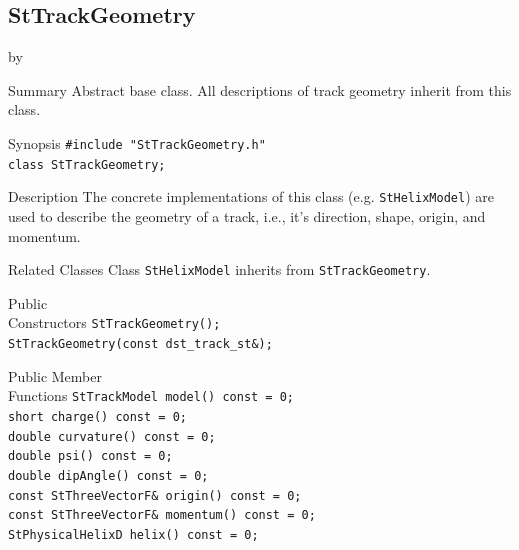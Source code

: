 \documentclass[twoside]{article}
\newcommand{\entrylabel}[1]{\mbox{\textbf{{#1}}}\hfil}%
\newenvironment{entry}
{\begin{list}{}%
    {\renewcommand{\makelabel}{\entrylabel}%
     \setlength{\labelwidth}{90pt}%
     \setlength{\leftmargin}{\labelwidth}
     \advance\leftmargin by \labelsep%
      }%
    }%
  {\end{list}}
\newcommand{\Entrylabel}[1]%
{\raisebox{0pt}[1ex][0pt]{\makebox[\labelwidth][l]%
    {\parbox[t]{\labelwidth}{\hspace{0pt}\textbf{{#1}}}}}}
\newenvironment{Entry}%
{\renewcommand{\entrylabel}{\Entrylabel}\begin{entry}}%
  {\end{entry}}
\begin{document}
\subsection{StTrackGeometry}
\label{sec:StTrackGeometry}
\begin{Entry}
\item[Summary]
    Abstract base class. All descriptions of track geometry inherit from this class.
    
\item[Synopsis]
    \verb+#include "StTrackGeometry.h"+\\
    \verb+class StTrackGeometry;+\\
\item[Description]
    The concrete implementations of this class (e.g.
    \texttt{StHelixModel}) are used to describe the geometry of a
    track, i.e., it's direction, shape, origin, and momentum.
    
\item[Related Classes]
    Class \texttt{StHelixModel} inherits from \texttt{StTrackGeometry}.
    
\item[Public\\ Constructors]
    \verb+StTrackGeometry();+\\
    \verb+StTrackGeometry(const dst_track_st&);+\\
\item[Public Member\\ Functions]
    \verb+StTrackModel model() const = 0;+\\
    \verb+short charge() const = 0;+\\
    \verb+double curvature() const = 0;+\\
    \verb+double psi() const = 0;+\\
    \verb+double dipAngle() const = 0;+\\
    \verb+const StThreeVectorF& origin() const = 0;+\\
    \verb+const StThreeVectorF& momentum() const = 0;+\\
    \verb+StPhysicalHelixD helix() const = 0;+\\
\end{Entry}
\clearpage
\end{document}
